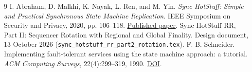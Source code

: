 \documentclass[11pt,a4paper]{article}
\begin{document}
\begin{thebibliography}{9}
I. Abraham, D. Malkhi, K. Nayak, L. Ren, and M. Yin.
\emph{Sync HotStuff: Simple and Practical Synchronous State Machine Replication}.
IEEE Symposium on Security and Privacy, 2020, pp. 106--118.
\href{https://conferences.computer.org/sp/pdfs/sp/2020/349700a106.pdf}{Published paper}.
Sync HotStuff RR, Part II: Sequencer Rotation with Regional and Global
Finality. Design document, 13 October 2026
(\texttt{sync\_hotstuff\_rr\_part2\_rotation.tex}).
F. B. Schneider. Implementing fault-tolerant services using the state machine
approach: a tutorial. \emph{ACM Computing Surveys}, 22(4):299--319, 1990.
\href{https://doi.org/10.1145/98163.98167}{DOI}.
\end{thebibliography}
\end{document}
